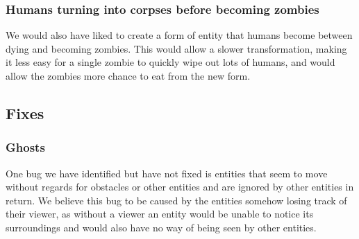 \subsubsection{Humans turning into corpses before becoming zombies}
We would also have liked to create a form of entity that humans become between dying and becoming zombies. This would allow a slower transformation, making it less easy for a single zombie to quickly wipe out lots of humans,  and would allow the zombies more chance to eat from the new form. 

\subsection{Fixes}

\subsubsection{Ghosts}
One bug we have identified but have not fixed is entities that seem to move without regards for obstacles or other entities and are ignored by other entities in return. We believe this bug to be caused by the entities somehow losing track of their viewer, as without a viewer an entity would be unable to notice its surroundings and would also have no way of being seen by other entities.

\clearpage
\endinput
